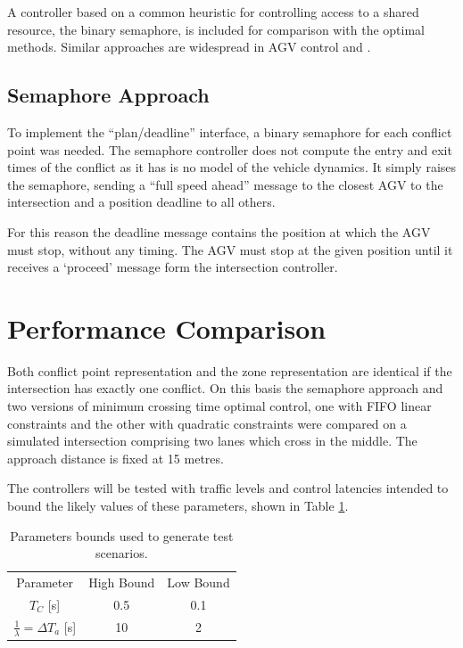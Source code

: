 \documentclass[]{article}
\begin{document}
A controller based on a common heuristic for controlling access to a shared resource, the binary semaphore, is included for comparison with the optimal methods.  Similar approaches are widespread in AGV control \cite{Duinkerken1999} and \cite{Lee2019}.


\subsection{Semaphore Approach}
To implement the ``plan/deadline'' interface, a binary semaphore for each conflict point was needed. The semaphore controller does not compute the entry and exit times of the conflict as it has is no model of the vehicle dynamics. It simply raises the semaphore, sending a ``full speed ahead'' message to the closest AGV to the intersection and a position deadline to all others.

For this reason the deadline message contains the position at which the AGV must stop, without any timing. The AGV must stop at the given position until it receives a `proceed' message form the intersection controller.

\section{Performance Comparison}
Both conflict point representation and the zone representation are identical if the intersection has exactly one conflict. On this basis the semaphore approach and two versions of minimum crossing time optimal control, one with FIFO linear constraints and the other with quadratic constraints were compared on a simulated intersection comprising two lanes which cross in the middle. The approach distance is fixed at 15 metres.

The controllers will be tested with traffic levels and control latencies intended to bound the likely values of these parameters, shown in Table \ref{tab:test_params}.

\begin{table}
	\caption{Parameters bounds used to generate test scenarios.}
	\label{tab:test_params} 
	\centering
	\begin{tabular}{ |c|c|c| }
		\hline
		Parameter & High Bound & Low Bound \\
		$T_C$ [s]& 0.5 & 0.1 \\ 
		$\frac{1}{\lambda}=\Delta T_a$ [s]& 10 & 2 \\ 	
		\hline
	\end{tabular}
\end{table}
\end{document}

